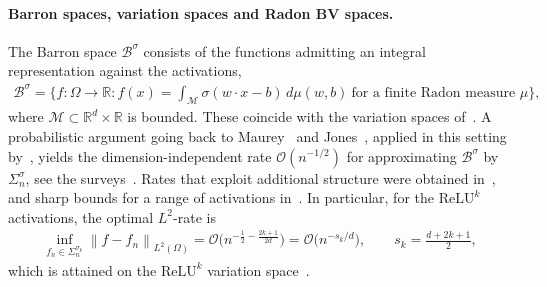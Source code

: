 \documentclass[12pt]{article}
\numberwithin{equation}{section}
\numberwithin{figure}{section}
\numberwithin{equation}{section}
\newcommand{\R}{\mathbb{R}}
\newcommand{\norm}[1]{\left\|#1\right\|}
\begin{document}
\paragraph{Barron spaces, variation spaces and Radon BV spaces.}
The Barron space $\mathcal B^{\sigma}$ consists of the functions admitting an
integral representation against the activations,
\begin{align*}
    \mathcal B^{\sigma}
    = \Big\{ f:\Omega\to\R : f(x)=\int_{\mathcal{M}}\sigma(w\cdot x-b)\,d\mu(w,b)
    \ \text{for a finite Radon measure }\mu \Big\},
\end{align*}
where $\mathcal{M} \subset \mathbb{R}^d \times \mathbb{R}$ is bounded.
These coincide with the variation spaces
of~\cite{e_barronspaceflowinduced_2022,siegel_characterizationvariationspaces_2023}.
A probabilistic argument going back to Maurey~\cite{pisier_RemarquesResultatNon_1981,%
Maurey1973-1974} and Jones~\cite{jones_simplelemmagreedy_1992}, applied in this
setting by~\cite{barron_universalapproximationbounds_1993,%
e_barronspaceflowinduced_2022,bach_breakingcursedimensionality_2017}, yields the
dimension-independent rate $\mathcal O(n^{-1/2})$ for approximating $\mathcal B^{\sigma}$
by $\Sigma_n^{\sigma}$, see the surveys~\cite{devore_nonlinearapproximation_1998,%
devore_neuralnetworkapproximation_2021}. Rates that exploit additional structure
were obtained in~\cite{klusowski_approximationcombinationsrelu_2018,%
makovoz_randomapproximantsneural_1996,li_twolayernetworks_2024}, and sharp
bounds for a range of activations in~\cite{siegel_sharpboundsapproximation_2024,%
siegel_optimalconvergencerates_2022}. In particular, for the $\mathrm{ReLU}^k$
activations, the optimal $L^2$-rate is
\begin{align*}
    \inf_{f_n\in\Sigma_n^{\sigma_k}}\norm{f-f_n}_{L^2(\Omega)}
    = \mathcal O\!\big(n^{-\frac12-\frac{2k+1}{2d}}\big)
    = \mathcal O\!\big(n^{-s_k/d}\big),
    \qquad s_k=\tfrac{d+2k+1}{2},
\end{align*}
which is attained on the $\mathrm{ReLU}^k$ variation
space~\cite{siegel_sharpboundsapproximation_2024}.
\end{document}

